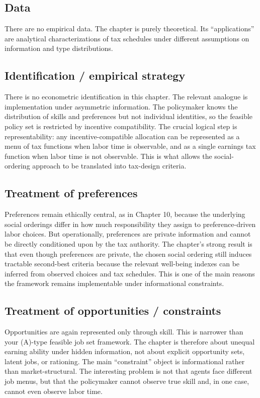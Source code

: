 \documentclass[11pt,a4paper]{article}
\begin{document}
\subsection*{Data}
There are no empirical data. The chapter is purely theoretical. Its “applications” are analytical characterizations of tax schedules under different assumptions on information and type distributions.

\subsection*{Identification / empirical strategy}
There is no econometric identification in this chapter. The relevant analogue is implementation under asymmetric information. The policymaker knows the distribution of skills and preferences but not individual identities, so the feasible policy set is restricted by incentive compatibility. The crucial logical step is representability: any incentive-compatible allocation can be represented as a menu of tax functions when labor time is observable, and as a single earnings tax function when labor time is not observable. This is what allows the social-ordering approach to be translated into tax-design criteria.

\subsection*{Treatment of preferences}
Preferences remain ethically central, as in Chapter 10, because the underlying social orderings differ in how much responsibility they assign to preference-driven labor choices. But operationally, preferences are private information and cannot be directly conditioned upon by the tax authority. The chapter’s strong result is that even though preferences are private, the chosen social ordering still induces tractable second-best criteria because the relevant well-being indexes can be inferred from observed choices and tax schedules. This is one of the main reasons the framework remains implementable under informational constraints.

\subsection*{Treatment of opportunities / constraints}
Opportunities are again represented only through skill. This is narrower than your (A)-type feasible job set framework. The chapter is therefore about unequal earning ability under hidden information, not about explicit opportunity sets, latent jobs, or rationing. The main “constraint” object is informational rather than market-structural. The interesting problem is not that agents face different job menus, but that the policymaker cannot observe true skill and, in one case, cannot even observe labor time.
\end{document}
